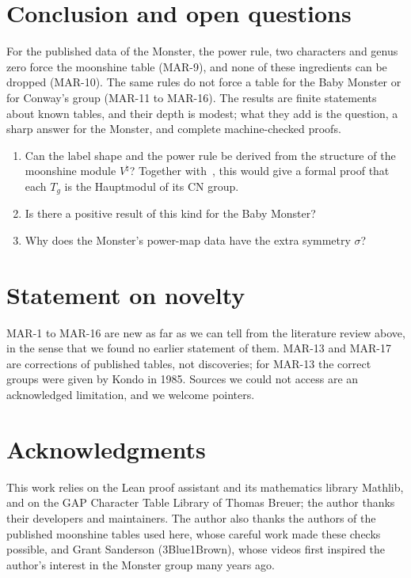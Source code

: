 \documentclass[11pt]{amsart}
\theoremstyle{definition}
\begin{document}
\section{Conclusion and open questions}\label{sec:end}
For the published data of the Monster, the power rule, two characters and genus zero force the moonshine table (MAR-9), and none of these ingredients can be dropped (MAR-10). The same rules do not force a table for the Baby Monster or for Conway's group (MAR-11 to MAR-16). The results are finite statements about known tables, and their depth is modest; what they add is the question, a sharp answer for the Monster, and complete machine-checked proofs.
\begin{enumerate}
\item Can the label shape and the power rule be derived from the structure of the moonshine module $V^\natural$? Together with~\cite{PopovVOA}, this would give a formal proof that each $T_g$ is the Hauptmodul of its CN group.
\item Is there a positive result of this kind for the Baby Monster?
\item Why does the Monster's power-map data have the extra symmetry $\sigma$?
\end{enumerate}

\section*{Statement on novelty}
MAR-1 to MAR-16 are new as far as we can tell from the literature review above, in the sense that we found no earlier statement of them. MAR-13 and MAR-17 are corrections of published tables, not discoveries; for MAR-13 the correct groups were given by Kondo in 1985. Sources we could not access are an acknowledged limitation, and we welcome pointers.

\section*{Acknowledgments}
This work relies on the Lean proof assistant and its mathematics library Mathlib, and on the GAP Character Table Library of Thomas Breuer; the author thanks their developers and maintainers. The author also thanks the authors of the published moonshine tables used here, whose careful work made these checks possible, and Grant Sanderson (3Blue1Brown), whose videos first inspired the author's interest in the Monster group many years ago.
\end{document}
